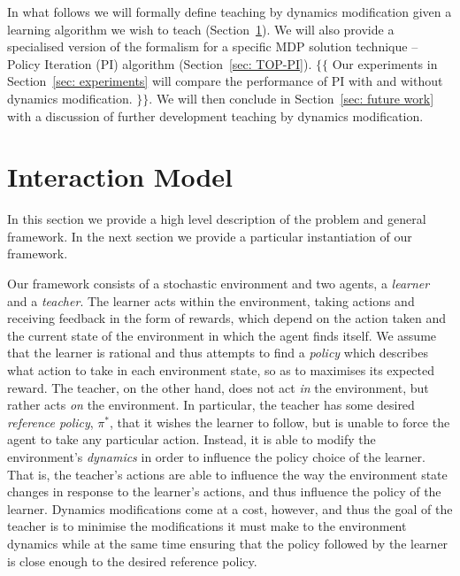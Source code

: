 \documentclass[letterpaper]{aamas2010}
\begin{document}
In what follows we will formally define teaching by dynamics
modification given a learning algorithm we wish to teach
(Section~\ref{sec: GeneralModel}). We will also provide a specialised
version of the formalism for a specific MDP solution technique --
Policy Iteration (PI) algorithm (Section~\ref{sec: TOP-PI}). $\{\{$
Our experiments in Section~\ref{sec: experiments} will compare the
performance of PI with and without dynamics modification. $\}\}$. We
will then conclude in Section~\ref{sec: future work} with a discussion
of further development teaching by dynamics modification.


\section{Interaction Model}\label{sec: GeneralModel}

In this section we provide a high level description of the problem and
general framework.  In the next section we provide a particular
instantiation of our framework.

Our framework consists of a stochastic environment and two agents, a
\emph{learner} and a \emph{teacher}.  The learner acts within the
environment, taking actions and receiving feedback in the form of
rewards, which depend on the action taken and the current state of the
environment in which the agent finds itself.  We assume that the
learner is rational and thus attempts to find a \emph{policy} which
describes what action to take in each environment state, so as to
maximises its expected reward.  The teacher, on the other hand, does
not act \emph{in} the environment, but rather acts \emph{on} the
environment.  In particular, the teacher has some desired
\emph{reference policy}, $\pi^*$, that it wishes the learner to
follow, but is unable to force the agent to take any particular
action.  Instead, it is able to modify the environment's
\emph{dynamics} in order to influence the policy choice of the
learner. That is, the teacher's actions are able to influence the way
the environment state changes in response to the learner's actions,
and thus influence the policy of the learner. Dynamics modifications
come at a cost, however, and thus the goal of the teacher is to
minimise the modifications it must make to the environment dynamics
while at the same time ensuring that the policy followed by the
learner is close enough to the desired reference policy.
\end{document}
